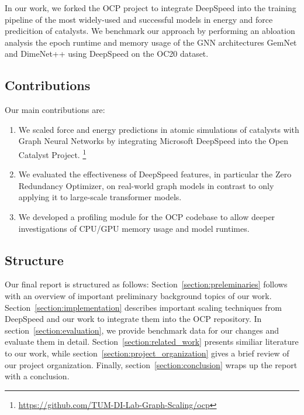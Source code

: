 In our work, we forked the OCP project to integrate DeepSpeed into the training pipeline of the most widely-used 
and successful models in energy and force predicition of catalysts. 
We benchmark our approach by performing an abloation analysis the epoch runtime and memory usage of the GNN architectures GemNet and 
DimeNet++ using DeepSpeed on the OC20 dataset.


\subsection{Contributions}

Our main contributions are:

\begin{enumerate}
    \item We scaled force and energy predictions in atomic simulations of catalysts with Graph Neural Networks 
    by integrating Microsoft DeepSpeed into the Open Catalyst Project.
    \footnote{\url{https://github.com/TUM-DI-Lab-Graph-Scaling/ocp}}
    \item We evaluated the effectiveness of DeepSpeed features, in particular the Zero Redundancy Optimizer, on 
    real-world graph models in contrast to only applying it to large-scale transformer models.
    \item We developed a profiling module for the OCP codebase to allow deeper investigations of CPU/GPU memory 
    usage and model runtimes.
\end{enumerate}

\subsection{Structure}

Our final report is structured as follows: Section~\ref{section:preleminaries} follows with an overview of 
important preliminary background topics of our work. Section~\ref{section:implementation} describes important 
scaling techniques from DeepSpeed and our work to integrate them into the OCP repository. In 
section~\ref{section:evaluation}, we provide benchmark data for our changes and evaluate them in detail. 
Section~\ref{section:related_work} presents similiar literature to our work, while section~\ref{section:project_organization} 
gives a brief review of our project organization. Finally, section~\ref{section:conclusion} wraps up the 
report with a conclusion.